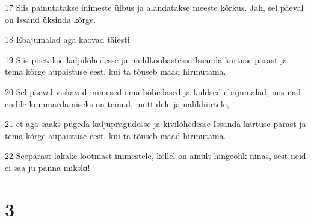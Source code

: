 \par 17 Siis painutatakse inimeste ülbus ja alandatakse meeste kõrkus. Jah, sel päeval on Issand üksinda kõrge.
\par 18 Ebajumalad aga kaovad täiesti.
\par 19 Siis poetakse kaljulõhedesse ja muldkoobastesse Issanda kartuse pärast ja tema kõrge aupaistuse eest, kui ta tõuseb maad hirmutama.
\par 20 Sel päeval viskavad inimesed oma hõbedased ja kuldsed ebajumalad, mis nad endile kummardamiseks on teinud, muttidele ja nahkhiirtele,
\par 21 et aga saaks pugeda kaljupragudesse ja kivilõhedesse Issanda kartuse pärast ja tema kõrge aupaistuse eest, kui ta tõuseb maad hirmutama.
\par 22 Seepärast lakake lootmast inimestele, kellel on ainult hingeõhk ninas, sest neid ei saa ju panna mikski!

\chapter{3}

